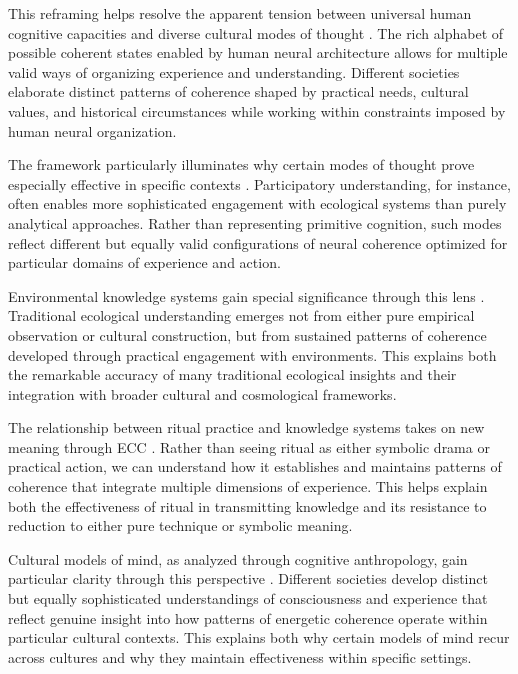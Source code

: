 This reframing helps resolve the apparent tension between universal human cognitive capacities and diverse cultural modes of thought \cite{sperber1996explaining}. The rich alphabet of possible coherent states enabled by human neural architecture allows for multiple valid ways of organizing experience and understanding. Different societies elaborate distinct patterns of coherence shaped by practical needs, cultural values, and historical circumstances while working within constraints imposed by human neural organization.

The framework particularly illuminates why certain modes of thought prove especially effective in specific contexts \cite{rappaport1984pigs}. Participatory understanding, for instance, often enables more sophisticated engagement with ecological systems than purely analytical approaches. Rather than representing primitive cognition, such modes reflect different but equally valid configurations of neural coherence optimized for particular domains of experience and action.

Environmental knowledge systems gain special significance through this lens \cite{bateson1979mind}. Traditional ecological understanding emerges not from either pure empirical observation or cultural construction, but from sustained patterns of coherence developed through practical engagement with environments. This explains both the remarkable accuracy of many traditional ecological insights and their integration with broader cultural and cosmological frameworks.

The relationship between ritual practice and knowledge systems takes on new meaning through ECC \cite{turner1982ritual}. Rather than seeing ritual as either symbolic drama or practical action, we can understand how it establishes and maintains patterns of coherence that integrate multiple dimensions of experience. This helps explain both the effectiveness of ritual in transmitting knowledge and its resistance to reduction to either pure technique or symbolic meaning.

Cultural models of mind, as analyzed through cognitive anthropology, gain particular clarity through this perspective \cite{boyer2001religion}. Different societies develop distinct but equally sophisticated understandings of consciousness and experience that reflect genuine insight into how patterns of energetic coherence operate within particular cultural contexts. This explains both why certain models of mind recur across cultures and why they maintain effectiveness within specific settings.


